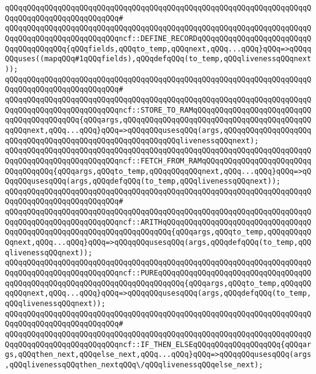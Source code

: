 \verb|qQQqqQQqqQQqqQQqqQQqqQQqqQQqqQQqqQQqqQQqqQQqqQQqqQQqqQQqqQQqqQQqqQQqqQQqqQQqqQQqqQQqqQQqqQQqqQQq#|\newline
\verb|qQQqqQQqqQQqqQQqqQQqqQQqqQQqqQQqqQQqqQQqqQQqqQQqqQQqqQQqqQQqqQQqqQQqqQQqqQQqqQQqqQQqqQQqqQQqqQQqncf::DEFINE_RECORDqQQqqQQqqQQqqQQqqQQqqQQqqQQqqQQqqQQqqQQq{qQQqfields,qQQqto_temp,qQQqnext,qQQq...qQQq}qQQq=>qQQqqQQquses((mapqQQq#1qQQqfields),qQQqdefqQQq(to_temp,qQQqlivenessqQQqnext));|\newline
\verb|qQQqqQQqqQQqqQQqqQQqqQQqqQQqqQQqqQQqqQQqqQQqqQQqqQQqqQQqqQQqqQQqqQQqqQQqqQQqqQQqqQQqqQQqqQQqqQQq#|\newline
\verb|qQQqqQQqqQQqqQQqqQQqqQQqqQQqqQQqqQQqqQQqqQQqqQQqqQQqqQQqqQQqqQQqqQQqqQQqqQQqqQQqqQQqqQQqqQQqqQQqncf::STORE_TO_RAMqQQqqQQqqQQqqQQqqQQqqQQqqQQqqQQqqQQqqQQqqQQq{qQQqargs,qQQqqQQqqQQqqQQqqQQqqQQqqQQqqQQqqQQqqQQqqQQqqQQqnext,qQQq...qQQq}qQQq=>qQQqqQQqusesqQQq(args,qQQqqQQqqQQqqQQqqQQqqQQqqQQqqQQqqQQqqQQqqQQqqQQqqQQqqQQqqQQqlivenessqQQqnext);|\newline
\verb|qQQqqQQqqQQqqQQqqQQqqQQqqQQqqQQqqQQqqQQqqQQqqQQqqQQqqQQqqQQqqQQqqQQqqQQqqQQqqQQqqQQqqQQqqQQqqQQqncf::FETCH_FROM_RAMqQQqqQQqqQQqqQQqqQQqqQQqqQQqqQQqqQQq{qQQqargs,qQQqto_temp,qQQqqQQqqQQqnext,qQQq...qQQq}qQQq=>qQQqqQQqusesqQQq(args,qQQqdefqQQq(to_temp,qQQqlivenessqQQqnext));|\newline
\verb|qQQqqQQqqQQqqQQqqQQqqQQqqQQqqQQqqQQqqQQqqQQqqQQqqQQqqQQqqQQqqQQqqQQqqQQqqQQqqQQqqQQqqQQqqQQqqQQq#|\newline
\verb|qQQqqQQqqQQqqQQqqQQqqQQqqQQqqQQqqQQqqQQqqQQqqQQqqQQqqQQqqQQqqQQqqQQqqQQqqQQqqQQqqQQqqQQqqQQqqQQqncf::ARITHqQQqqQQqqQQqqQQqqQQqqQQqqQQqqQQqqQQqqQQqqQQqqQQqqQQqqQQqqQQqqQQqqQQqqQQq{qQQqargs,qQQqto_temp,qQQqqQQqqQQqnext,qQQq...qQQq}qQQq=>qQQqqQQqusesqQQq(args,qQQqdefqQQq(to_temp,qQQqlivenessqQQqnext));|\newline
\verb|qQQqqQQqqQQqqQQqqQQqqQQqqQQqqQQqqQQqqQQqqQQqqQQqqQQqqQQqqQQqqQQqqQQqqQQqqQQqqQQqqQQqqQQqqQQqqQQqncf::PUREqQQqqQQqqQQqqQQqqQQqqQQqqQQqqQQqqQQqqQQqqQQqqQQqqQQqqQQqqQQqqQQqqQQqqQQqqQQq{qQQqargs,qQQqto_temp,qQQqqQQqqQQqnext,qQQq...qQQq}qQQq=>qQQqqQQqusesqQQq(args,qQQqdefqQQq(to_temp,qQQqlivenessqQQqnext));|\newline
\verb|qQQqqQQqqQQqqQQqqQQqqQQqqQQqqQQqqQQqqQQqqQQqqQQqqQQqqQQqqQQqqQQqqQQqqQQqqQQqqQQqqQQqqQQqqQQqqQQq#|\newline
\verb|qQQqqQQqqQQqqQQqqQQqqQQqqQQqqQQqqQQqqQQqqQQqqQQqqQQqqQQqqQQqqQQqqQQqqQQqqQQqqQQqqQQqqQQqqQQqqQQqncf::IF_THEN_ELSEqQQqqQQqqQQqqQQqqQQq{qQQqargs,qQQqthen_next,qQQqelse_next,qQQq...qQQq}qQQq=>qQQqqQQqusesqQQq(args,qQQqlivenessqQQqthen_nextqQQq\/qQQqlivenessqQQqelse_next);|\newline
